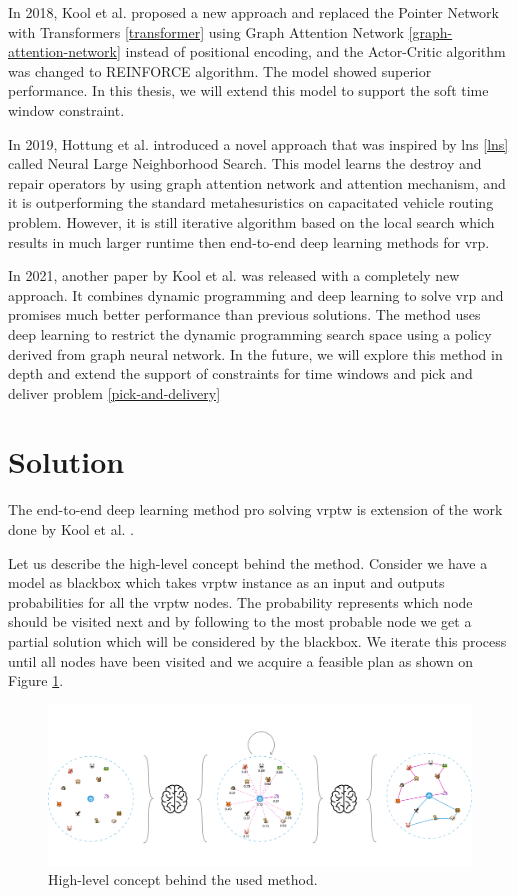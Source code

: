 In 2018, Kool et al. \cite{attention-route} proposed a new approach and replaced the Pointer Network with Transformers \ref{transformer} using Graph Attention Network \ref{graph-attention-network} instead of positional encoding, and the Actor-Critic algorithm was changed to REINFORCE algorithm. The model showed superior performance. In this thesis, we will extend this model to support the soft time window constraint.

In 2019, Hottung et al. \cite{hottung} introduced a novel approach that was inspired by \gls{lns} \ref{lns} called Neural Large Neighborhood Search. This model learns the destroy and repair operators by using graph attention network and attention mechanism, and it is outperforming the standard metahesuristics on capacitated vehicle routing problem. However, it is still iterative algorithm based on the local search which results in much larger runtime then end-to-end deep learning methods for \gls{vrp}.

In 2021, another paper by Kool et al.\cite{dpdp} was released with a completely new approach. It combines  dynamic programming and deep learning to solve \gls{vrp} and promises much better performance than previous solutions. The method uses deep learning to restrict the dynamic programming search space using a policy derived from graph neural network. In the future, we will explore this method in depth and extend the support of constraints for time windows and pick and deliver problem \ref{pick-and-delivery}

\section{Solution}
The end-to-end deep learning method pro solving \gls{vrptw} is extension of the work done by Kool et al. \cite{attention-route}. 

Let us describe the high-level concept behind the method. Consider we have a model as blackbox which takes \gls{vrptw} instance as an input and outputs probabilities for all the \gls{vrptw} nodes. The probability represents which node should be visited next and by following to the most probable node we get a partial solution which will be considered by the blackbox. We iterate this process until all nodes have been visited and we acquire a feasible plan as shown on Figure \ref{fig:attention-route-diagram}.

    \begin{figure}[ht]
        \centering
        \includegraphics[width=1.0\textwidth]{resources/vrptw-ai/attention-route-diagram.pdf}
        \caption{High-level concept behind the used method.}
        \label{fig:attention-route-diagram}
    \end{figure}

